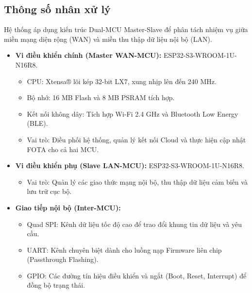 
\subsection{Thông số nhân xử lý}
    Hệ thống áp dụng kiến trúc Dual-MCU Master-Slave để phân tách nhiệm vụ giữa miền mạng diện rộng (WAN) và miền thu thập dữ liệu nội bộ (LAN).
    \begin{itemize}
        \item \textbf{Vi điều khiển chính (Master WAN-MCU):} ESP32-S3-WROOM-1U-N16R8.
        \begin{itemize}
            \item CPU: Xtensa® lõi kép 32-bit LX7, xung nhịp lên đến 240 MHz.
            \item Bộ nhớ: 16 MB Flash và 8 MB PSRAM tích hợp.
            \item Kết nối không dây: Tích hợp Wi-Fi 2.4 GHz và Bluetooth Low Energy (BLE).
            \item Vai trò: Điều phối hệ thống, quản lý kết nối Cloud và thực hiện cập nhật FOTA cho cả hai MCU.
        \end{itemize}
        \item \textbf{Vi điều khiển phụ (Slave LAN-MCU):} ESP32-S3-WROOM-1U-N16R8.
        \begin{itemize}
            \item Vai trò: Quản lý các giao thức mạng nội bộ, thu thập dữ liệu cảm biến và lưu trữ cục bộ.
        \end{itemize}
        \item \textbf{Giao tiếp nội bộ (Inter-MCU):} 
        \begin{itemize}
            \item Quad SPI: Kênh dữ liệu tốc độ cao để trao đổi khung tin dữ liệu và yêu cầu.
            \item UART: Kênh chuyên biệt dành cho luồng nạp Firmware liên chip (Passthrough Flashing).
            \item GPIO: Các đường tín hiệu điều khiển và ngắt (Boot, Reset, Interrupt) để đồng bộ trạng thái.
        \end{itemize}
    \end{itemize}